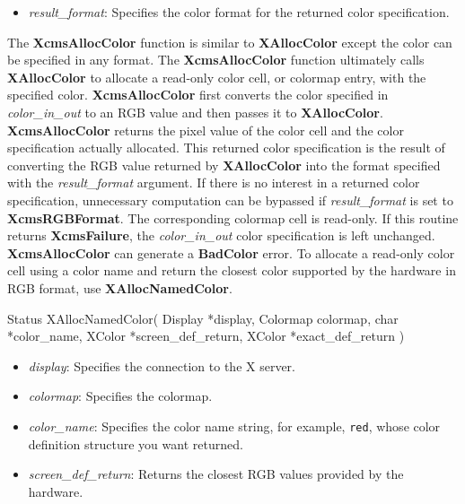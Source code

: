 \documentclass{report}
\begin{document}
\begin{itemize}
\begin{itemize}
                \item \textit{result\_format}: Specifies the color format for the returned color specification.
            \end{itemize}
            \noindent
            The \textbf{XcmsAllocColor} function is similar to \textbf{XAllocColor} except the color can be specified in any format. The \textbf{XcmsAllocColor} function ultimately calls \textbf{XAllocColor} to allocate a read-only color cell, or colormap entry, with the specified color. \textbf{XcmsAllocColor} first converts the color specified in \textit{color\_in\_out} to an RGB value and then passes it to \textbf{XAllocColor}. \textbf{XcmsAllocColor} returns the pixel value of the color cell and the color specification actually allocated. This returned color specification is the result of converting the RGB value returned by \textbf{XAllocColor} into the format specified with the \textit{result\_format} argument. If there is no interest in a returned color specification, unnecessary computation can be bypassed if \textit{result\_format} is set to \textbf{XcmsRGBFormat}. The corresponding colormap cell is read-only. If this routine returns \textbf{XcmsFailure}, the \textit{color\_in\_out} color specification is left unchanged.
            \bigbreak \noindent
            \textbf{XcmsAllocColor} can generate a \textbf{BadColor} error.
            \bigbreak \noindent
            To allocate a read-only color cell using a color name and return the closest color supported by the hardware in RGB format, use \textbf{XAllocNamedColor}.
            \bigbreak \noindent 
            \begin{cppcode}
                Status XAllocNamedColor(
                    Display *display,
                    Colormap colormap,
                    char *color_name,
                    XColor *screen_def_return,
                    XColor *exact_def_return
                )
            \end{cppcode}
            \bigbreak \noindent
            \begin{itemize}
                \item \textit{display}: Specifies the connection to the X server.
                \item \textit{colormap}: Specifies the colormap.
                \item \textit{color\_name}: Specifies the color name string, for example, \texttt{red}, whose color definition structure you want returned.
                \item \textit{screen\_def\_return}: Returns the closest RGB values provided by the hardware.

\end{itemize}
\end{itemize}
\end{document}
